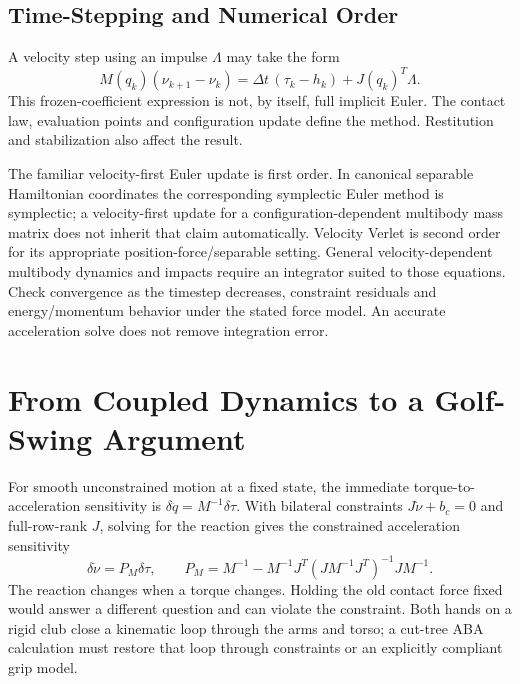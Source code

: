 \subsection{Time-Stepping and Numerical Order}
\label{subsec:time_stepping}

A velocity step using an impulse $\Lambda$ may take the form
\begin{equation}
 M(q_k)(\nu_{k+1}-\nu_k)
 =\Delta t\,(\tau_k-h_k)+J(q_k)^T\Lambda.
 \label{eq:time_stepping}
\end{equation}
This frozen-coefficient expression is not, by itself, full implicit Euler. The contact law, evaluation points and configuration update define the method. Restitution and stabilization also affect the result.

The familiar velocity-first Euler update is first order. In canonical separable Hamiltonian coordinates the corresponding symplectic Euler method is symplectic; a velocity-first update for a configuration-dependent multibody mass matrix does not inherit that claim automatically. Velocity Verlet is second order for its appropriate position-force/separable setting. General velocity-dependent multibody dynamics and impacts require an integrator suited to those equations. Check convergence as the timestep decreases, constraint residuals and energy/momentum behavior under the stated force model. An accurate acceleration solve does not remove integration error.

\section{From Coupled Dynamics to a Golf-Swing Argument}

For smooth unconstrained motion at a fixed state, the immediate torque-to-acceleration sensitivity is $\delta\ddot q=M^{-1}\delta\tau$. With bilateral constraints $J\dot\nu+b_c=0$ and full-row-rank $J$, solving for the reaction gives the constrained acceleration sensitivity
\begin{equation}
 \delta\dot\nu=P_M\delta\tau,\qquad
 P_M=M^{-1}-M^{-1}J^T(JM^{-1}J^T)^{-1}JM^{-1}.
\end{equation}
The reaction changes when a torque changes. Holding the old contact force fixed would answer a different question and can violate the constraint. Both hands on a rigid club close a kinematic loop through the arms and torso; a cut-tree ABA calculation must restore that loop through constraints or an explicitly compliant grip model.


